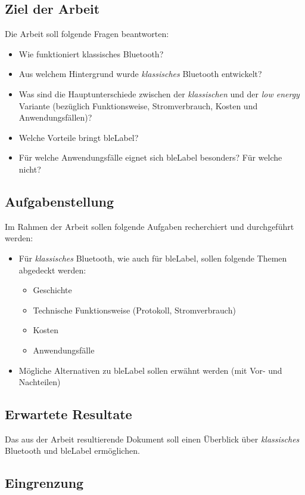 \subsection{Ziel der Arbeit}
Die Arbeit soll folgende Fragen beantworten:
\begin{itemize}
	\item Wie funktioniert klassisches Bluetooth?
	\item Aus welchem Hintergrund wurde \textit{klassisches} Bluetooth entwickelt?
	\item Was sind die Hauptunterschiede zwischen der \textit{klassischen} und der \textit{low energy} Variante (bezüglich Funktionsweise, Stromverbrauch, Kosten und Anwendungsfällen)?
	\item Welche Vorteile bringt \gls{bleLabel}?
	\item Für welche Anwendungsfälle eignet sich \gls{bleLabel} besonders? Für welche nicht?
\end{itemize}

\subsection{Aufgabenstellung}
Im Rahmen der Arbeit sollen folgende Aufgaben recherchiert und durchgeführt werden:
\begin{itemize}
	\item Für \textit{klassisches} Bluetooth, wie auch für \gls{bleLabel}, sollen folgende Themen abgedeckt werden:
	\begin{itemize}
		\item Geschichte
		\item Technische Funktionsweise (Protokoll, Stromverbrauch)
		\item Kosten
		\item Anwendungsfälle
	\end{itemize}
	\item Mögliche Alternativen zu \gls{bleLabel} sollen erwähnt werden (mit Vor- und Nachteilen)
\end{itemize}

\subsection{Erwartete Resultate}
Das aus der Arbeit resultierende Dokument soll einen Überblick über \textit{klassisches} Bluetooth und \gls{bleLabel} ermöglichen.

\subsection{Eingrenzung}

